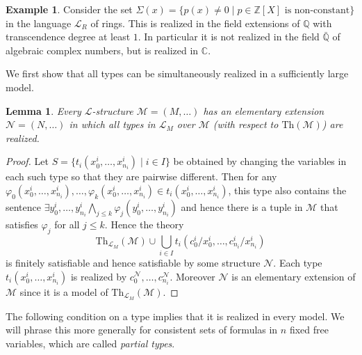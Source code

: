 \documentclass[10pt]{amsart}
\renewcommand{\L}{\mathcal{L}}
\newcommand{\ZZ}{\mathbb{Z}}
\newcommand{\QQ}{\mathbb{Q}}
\newcommand{\CCC}{\mathbb{C}}
\newcommand{\MM}{\mathcal{M}}
\newcommand{\NN}{\mathcal{N}}
\newcommand{\Th}{\mathrm{Th}}
\newtheorem{lemma}[theorem]{Lemma}
\theoremstyle{definition}
\newtheorem{example}[theorem]{Example}
\theoremstyle{remark}
\begin{document}
\begin{example} 
Consider the set $\Sigma(x)=\{p(x)\neq 0\mid p\in \ZZ[X]\text{ is non-constant}\}$ in the language $\L_R$ of rings. This is realized in the field extensions of $\QQ$ with transcendence degree at least $1$. In particular it is not realized in the field $\bar{\QQ}$ of algebraic complex numbers, but is realized in $\CCC$. 
\end{example} 

We first show that all types can be simultaneously realized in a sufficiently large model. 

\begin{lemma} \label{realizing types} 
Every $\L$-structure $\MM=(M,\dots)$ has an elementary extension $\NN=(N,\dots)$ in which all types in $\L_M$ over $\MM$ (with respect to $\Th(\MM)$) are realized. 
\end{lemma} 
\begin{proof} 
Let $S=\{t_i(x_0^i,\dots,x_{n_i}^i)\mid i\in I\}$ be obtained by changing the variables in each such type so that they are pairwise different. 
Then for any $\varphi_0(x_0^i,\dots,x_{n_i}^i),\dots,\varphi_k(x_0^i,\dots,x_{n_i}^i)\in t_i(x_0^i,\dots,x_{n_i}^i)$, this type also contains the sentence $\exists y_0^i,\dots,y_{n_i}^i \bigwedge_{j\leq k}\varphi_j(y_0^i,\dots,y_{n_i}^i)$ and hence there is a tuple in $\MM$ that satisfies $\varphi_j$ for all $j\leq k$. Hence the theory 
$$\Th_{\L_M}(\MM)\cup \bigcup_{i\in I} t_i(c_0^i/x_0^i,\dots,c_{n_i}^i/x_{n_i}^i)$$ 
is finitely satisfiable and hence satisfiable by some structure $\NN$. Each type $t_i(x_0^i,\dots,x_{n_i}^i)$ is realized by $c_0^\NN,\dots,c_{n_i}^\NN$. Moreover $\NN$ is an elementary extension of $\MM$ since it is a model of $\Th_{\L_M}(\MM)$. 
\end{proof} 

The following condition on a type implies that it is realized in every model. We will phrase this more generally for consistent sets of formulas in $n$ fixed free variables, which are called \emph{partial types}. 
\end{document}
